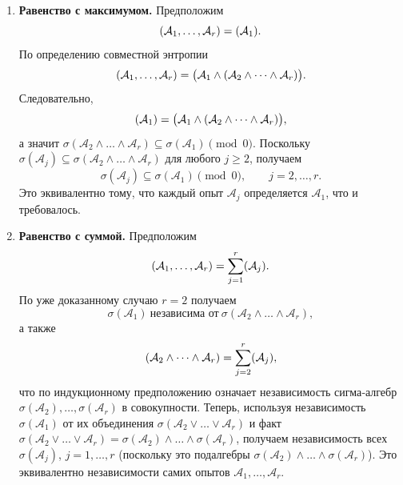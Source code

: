 \begin{enumerate}[label=\arabic*., leftmargin=*, nosep]
    \item \textbf{Равенство с максимумом.}
          Предположим
          \[
              \relax(\mathcal{A}_{1},\dots,\mathcal{A}_{r})=\relax(\mathcal{A}_{1}).
          \]
          По определению совместной энтропии
          \[
              \relax(\mathcal{A}_{1},\dots,\mathcal{A}_{r})
              =\relax\bigl(\mathcal{A}_{1}\land(\mathcal{A}_{2}\land\dots\land\mathcal{A}_{r})\bigr).
          \]
          Следовательно,
          \[
              \relax(\mathcal{A}_{1})=\relax\bigl(\mathcal{A}_{1}\land(\mathcal{A}_{2}\land\dots\land\mathcal{A}_{r})\bigr),
          \]
          а значит \(\sigma(\mathcal{A}_{2}\land\dots\land\mathcal{A}_{r})\subseteq\sigma(\mathcal{A}_{1})\pmod 0\). Поскольку
          \(\sigma(\mathcal{A}_{j})\subseteq\sigma(\mathcal{A}_{2}\land\dots\land\mathcal{A}_{r})\) для любого \(j\ge2\), получаем
          \[
              \sigma(\mathcal{A}_{j})\subseteq\sigma(\mathcal{A}_{1})\pmod 0,\qquad j=2,\dots,r.
          \]
          Это эквивалентно тому, что каждый опыт \(\mathcal{A}_{j}\) определяется \(\mathcal{A}_{1}\), что и требовалось.

    \item \textbf{Равенство с суммой.}
          Предположим
          \[
              \relax(\mathcal{A}_{1},\dots,\mathcal{A}_{r})
              =\sum_{j=1}^{r}\relax(\mathcal{A}_{j}).
          \]
          По уже доказанному случаю \(r=2\) получаем
          \[
              \sigma(\mathcal{A}_{1})\ \text{независима от}\ \sigma(\mathcal{A}_{2}\land\dots\land\mathcal{A}_{r}),
          \]
          а также
          \[
              \relax(\mathcal{A}_{2}\land\dots\land\mathcal{A}_{r})
              =\sum_{j=2}^{r}\relax(\mathcal{A}_{j}),
          \]
          что по индукционному предположению означает независимость сигма‑алгебр
          \(\sigma(\mathcal{A}_{2}),\dots,\sigma(\mathcal{A}_{r})\) в совокупности.
          Теперь, используя независимость \(\sigma(\mathcal{A}_{1})\) от их объединения
          \(\sigma(\mathcal{A}_{2}\lor\dots\lor\mathcal{A}_{r})\) и факт
          \(\sigma(\mathcal{A}_{2}\lor\dots\lor\mathcal{A}_{r})
           =\sigma(\mathcal{A}_{2}) \land\dots\land \sigma(\mathcal{A}_{r})\),
          получаем независимость всех \(\sigma(\mathcal{A}_{j})\), \(j=1,\dots,r\) (поскольку это подалгебры $\sigma(\mathcal{A}_{2}) \land\dots\land \sigma(\mathcal{A}_{r})$).
          Это эквивалентно независимости самих опытов \(\mathcal{A}_{1},\dots,\mathcal{A}_{r}\).
\end{enumerate}

